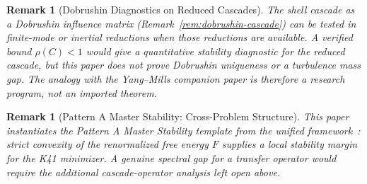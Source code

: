\documentclass[12pt,a4paper]{article}
\theoremstyle{breakdef}
\theoremstyle{breakplain}
\theoremstyle{breakdef}
\newtheorem{remark}[definition]{Remark}
\begin{document}
\begin{remark}[Dobrushin Diagnostics on Reduced Cascades]
\label{rem:dobrushin-inertial}
The shell cascade as a Dobrushin influence matrix
(Remark~\ref{rem:dobrushin-cascade}) can be tested in finite-mode or
inertial reductions when those reductions are available. A verified bound
$\rho(C)<1$ would give a quantitative stability diagnostic for the reduced
cascade, but this paper does not prove Dobrushin uniqueness or a turbulence
mass gap. The analogy with the Yang--Mills companion paper is therefore a
research program, not an imported theorem.
\end{remark}

\begin{remark}[Pattern A Master Stability: Cross-Problem Structure]
This paper instantiates the Pattern A Master Stability template from the
unified framework~\cite{FST-Unified2026}: strict convexity of the
renormalized free energy $F$ supplies a local stability margin for the K41
minimizer. A genuine spectral gap for a transfer operator would require the
additional cascade-operator analysis left open above.
\end{remark}

{}

\end{document}
